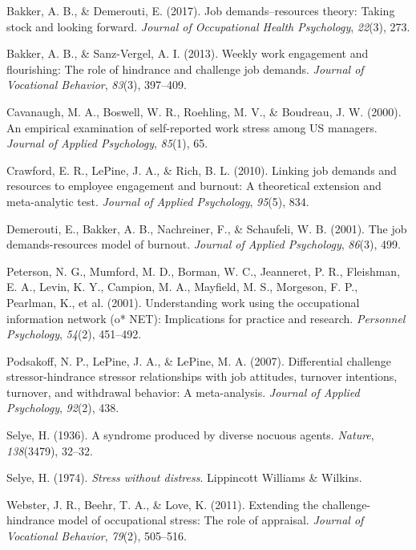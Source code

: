 \documentclass[
  man]{apa6}
\newlength{\cslhangindent}
\newlength{\cslentryspacingunit} %
\newenvironment{CSLReferences}[2] %
 {%
  \setlength{\parindent}{0pt}
  \ifodd #1
  \let\oldpar\par
  \def\par{\hangindent=\cslhangindent\oldpar}
  \fi
  \setlength{\parskip}{#2\cslentryspacingunit}
 }%
 {}
\begin{document}
\hypertarget{refs}{}
\begin{CSLReferences}{1}{0}
\leavevmode{}%
Bakker, A. B., \& Demerouti, E. (2017). Job demands--resources theory: Taking stock and looking forward. \emph{Journal of Occupational Health Psychology}, \emph{22}(3), 273.

\leavevmode{}%
Bakker, A. B., \& Sanz-Vergel, A. I. (2013). Weekly work engagement and flourishing: The role of hindrance and challenge job demands. \emph{Journal of Vocational Behavior}, \emph{83}(3), 397--409.

\leavevmode{}%
Cavanaugh, M. A., Boswell, W. R., Roehling, M. V., \& Boudreau, J. W. (2000). An empirical examination of self-reported work stress among US managers. \emph{Journal of Applied Psychology}, \emph{85}(1), 65.

\leavevmode{}%
Crawford, E. R., LePine, J. A., \& Rich, B. L. (2010). Linking job demands and resources to employee engagement and burnout: A theoretical extension and meta-analytic test. \emph{Journal of Applied Psychology}, \emph{95}(5), 834.

\leavevmode{}%
Demerouti, E., Bakker, A. B., Nachreiner, F., \& Schaufeli, W. B. (2001). The job demands-resources model of burnout. \emph{Journal of Applied Psychology}, \emph{86}(3), 499.

\leavevmode{}%
Peterson, N. G., Mumford, M. D., Borman, W. C., Jeanneret, P. R., Fleishman, E. A., Levin, K. Y., Campion, M. A., Mayfield, M. S., Morgeson, F. P., Pearlman, K., et al. (2001). Understanding work using the occupational information network (o* NET): Implications for practice and research. \emph{Personnel Psychology}, \emph{54}(2), 451--492.

\leavevmode{}%
Podsakoff, N. P., LePine, J. A., \& LePine, M. A. (2007). Differential challenge stressor-hindrance stressor relationships with job attitudes, turnover intentions, turnover, and withdrawal behavior: A meta-analysis. \emph{Journal of Applied Psychology}, \emph{92}(2), 438.

\leavevmode{}%
Selye, H. (1936). A syndrome produced by diverse nocuous agents. \emph{Nature}, \emph{138}(3479), 32--32.

\leavevmode{}%
Selye, H. (1974). \emph{Stress without distress}. Lippincott Williams \& Wilkins.

\leavevmode{}%
Webster, J. R., Beehr, T. A., \& Love, K. (2011). Extending the challenge-hindrance model of occupational stress: The role of appraisal. \emph{Journal of Vocational Behavior}, \emph{79}(2), 505--516.

\end{CSLReferences}
\end{document}
